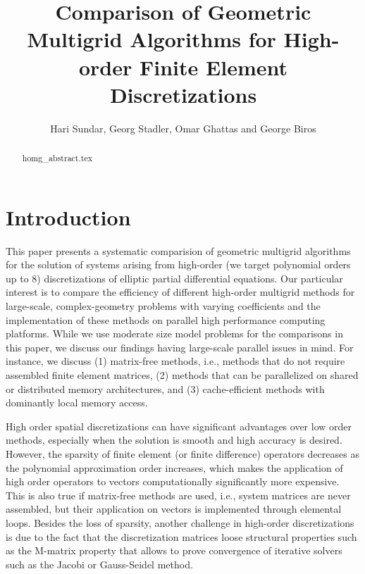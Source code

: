 \documentclass[times]{nlaauth}
\begin{document}

\title{Comparison of Geometric Multigrid Algorithms for High-order Finite Element Discretizations}

\author{Hari Sundar\corrauth, Georg Stadler, Omar Ghattas and George Biros}

\address{Institute for Computational Engineering \& Sciences, University of Texas, Austin, TX 78712}


\begin{abstract}
 {homg_abstract.tex}
\end{abstract}


\maketitle


\section{Introduction}

This paper presents a systematic comparision of geometric multigrid
algorithms for the solution of systems arising from high-order (we
target polynomial orders up to 8) discretizations of elliptic partial
differential equations. Our particular interest is to compare the
efficiency of different high-order multigrid methods for large-scale,
complex-geometry problems with varying coefficients and the
implementation of these methods on parallel high performance computing
platforms. While we use moderate size model problems for the
comparisons in this paper, we discuss our findings having large-scale
parallel issues in mind. For instance,
we discuss (1) matrix-free methods, i.e., methods that do not require
assembled finite element matrices, (2) methods that can be
parallelized on shared or distributed memory architectures, and (3)
cache-efficient methods with dominantly local memory access.

High order spatial discretizations can have significant advantages
over low order methods, especially when the solution is smooth and
high accuracy is desired. However, the sparsity of finite element (or
finite difference) operators decreases as the polynomial approximation
order increases, which makes the application of high order operators
to vectors computationally significantly more expensive. This is also
true if matrix-free methods are used, i.e., system matrices are never
assembled, but their application on vectors is implemented through
elemental loops.  Besides the loss of sparsity, another challenge in
high-order discretizations is due to the fact that the discretization
matrices loose structural properties such as the M-matrix property
that allows to prove convergence of iterative solvers such as the
Jacobi or Gauss-Seidel method.
\end{document}
